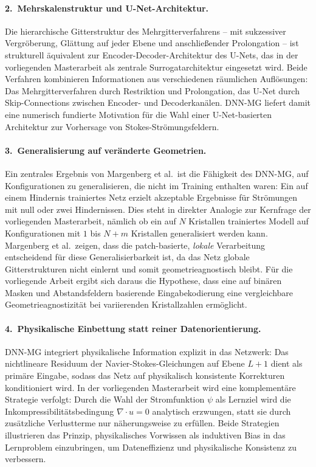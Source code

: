 \documentclass[a4paper,12pt]{article}
\begin{document}
\paragraph{2.\ Mehrskalenstruktur und U-Net-Architektur.}
Die hierarchische Gitterstruktur des Mehrgitterverfahrens -- mit sukzessiver
Vergröberung, Glättung auf jeder Ebene und anschließender Prolongation --
ist strukturell äquivalent zur Encoder-Decoder-Architektur des U-Nets, das
in der vorliegenden Masterarbeit als zentrale Surrogatarchitektur eingesetzt
wird. Beide Verfahren kombinieren Informationen aus verschiedenen räumlichen
Auflösungen: Das Mehrgitterverfahren durch Restriktion und Prolongation,
das U-Net durch Skip-Connections zwischen Encoder- und Decoderkanälen.
DNN-MG liefert damit eine numerisch fundierte Motivation für die Wahl einer
U-Net-basierten Architektur zur Vorhersage von Stokes-Strömungsfeldern.

\paragraph{3.\ Generalisierung auf veränderte Geometrien.}
Ein zentrales Ergebnis von Margenberg et al.\ ist die Fähigkeit des DNN-MG,
auf Konfigurationen zu generalisieren, die nicht im Training enthalten waren:
Ein auf einem Hindernis trainiertes Netz erzielt akzeptable Ergebnisse für
Strömungen mit null oder zwei Hindernissen. Dies steht in direkter Analogie
zur Kernfrage der vorliegenden Masterarbeit, nämlich ob ein auf $N$ Kristallen
trainiertes Modell auf Konfigurationen mit $1$ bis $N+m$ Kristallen
generalisiert werden kann. Margenberg et al.\ zeigen, dass die patch-basierte,
\emph{lokale} Verarbeitung entscheidend für diese Generalisierbarkeit ist, da
das Netz globale Gitterstrukturen nicht einlernt und somit geometrieagnostisch
bleibt. Für die vorliegende Arbeit ergibt sich daraus die Hypothese, dass eine
auf binären Masken und Abstandsfeldern basierende Eingabekodierung eine
vergleichbare Geometrieagnostizität bei variierenden Kristallzahlen ermöglicht.

\paragraph{4.\ Physikalische Einbettung statt reiner Datenorientierung.}
DNN-MG integriert physikalische Information explizit in das Netzwerk: Das
nichtlineare Residuum der Navier-Stokes-Gleichungen auf Ebene $L+1$ dient als
primäre Eingabe, sodass das Netz auf physikalisch konsistente Korrekturen
konditioniert wird. In der vorliegenden Masterarbeit wird eine komplementäre
Strategie verfolgt: Durch die Wahl der Stromfunktion $\psi$ als Lernziel wird
die Inkompressibilitätsbedingung $\nabla \cdot u = 0$ analytisch erzwungen,
statt sie durch zusätzliche Verlustterme nur näherungsweise zu erfüllen.
Beide Strategien illustrieren das Prinzip, physikalisches Vorwissen als
induktiven Bias in das Lernproblem einzubringen, um Dateneffizienz und
physikalische Konsistenz zu verbessern.
\end{document}
